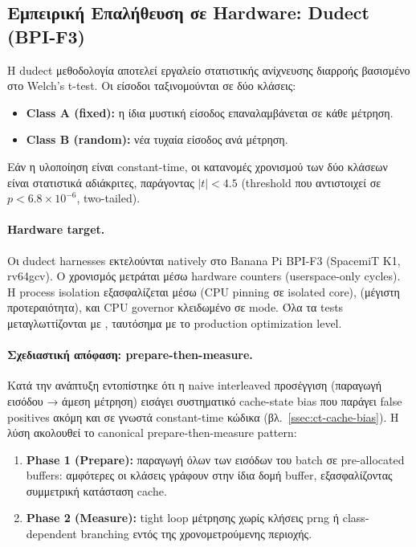 \subsection{Εμπειρική Επαλήθευση σε Hardware: Dudect (BPI-F3)}
\label{ssec:ct-dudect}

Η dudect μεθοδολογία \cite{Reparaz2017-dudect} αποτελεί εργαλείο
στατιστικής ανίχνευσης διαρροής βασισμένο στο Welch's t-test. Οι
είσοδοι ταξινομούνται σε δύο κλάσεις:
\begin{itemize}
  \item \textbf{Class A (fixed):} η ίδια μυστική είσοδος επαναλαμβάνεται
    σε κάθε μέτρηση.
  \item \textbf{Class B (random):} νέα τυχαία είσοδος ανά μέτρηση.
\end{itemize}
Εάν η υλοποίηση είναι constant-time, οι κατανομές χρονισμού των δύο
κλάσεων είναι στατιστικά αδιάκριτες, παράγοντας $|t| < 4.5$ (threshold
που αντιστοιχεί σε $p < 6.8 \times 10^{-6}$, two-tailed).

\paragraph{Hardware target.}
Οι dudect harnesses εκτελούνται natively στο Banana Pi BPI-F3 (SpacemiT K1,
rv64gcv). Ο χρονισμός μετράται μέσω  hardware
counters (userspace-only cycles). Η process isolation εξασφαλίζεται μέσω
 (CPU pinning σε isolated core), 
(μέγιστη προτεραιότητα), και CPU governor κλειδωμένο σε 
mode. Όλα τα tests μεταγλωττίζονται με , ταυτόσημα
με το production optimization level.

\paragraph{Σχεδιαστική απόφαση: prepare-then-measure.}
Κατά την ανάπτυξη εντοπίστηκε ότι η naive interleaved προσέγγιση (παραγωγή
εισόδου → άμεση μέτρηση) εισάγει συστηματικό cache-state bias που παράγει
false positives ακόμη και σε γνωστά constant-time κώδικα
(βλ.\ \cref{ssec:ct-cache-bias}). Η λύση ακολουθεί το canonical
prepare-then-measure pattern:
\begin{enumerate}
  \item \textbf{Phase 1 (Prepare):} παραγωγή όλων των εισόδων του batch
    σε pre-allocated buffers: αμφότερες οι κλάσεις γράφουν στην ίδια
    δομή buffer, εξασφαλίζοντας συμμετρική κατάσταση cache.
  \item \textbf{Phase 2 (Measure):} tight loop μέτρησης χωρίς κλήσεις
    \gls{prng} ή class-dependent branching εντός της χρονομετρούμενης
    περιοχής.
\end{enumerate}


